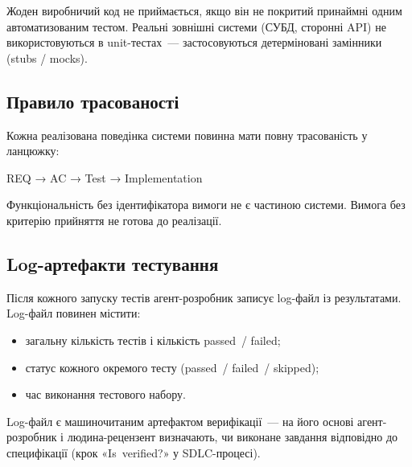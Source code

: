 Жоден виробничий код не приймається, якщо він не покритий принаймні одним автоматизованим тестом. Реальні зовнішні системи (СУБД, сторонні API) не використовуються в unit-тестах~--- застосовуються детерміновані замінники (stubs / mocks).

\subsection{Правило трасованості}

Кожна реалізована поведінка системи повинна мати повну трасованість у ланцюжку:

\begin{codelisting}
\caption{Ланцюжок трасованості}
\label{lst:trace}
\begin{skedcode}
REQ → AC → Test → Implementation
\end{skedcode}
\end{codelisting}

Функціональність без ідентифікатора вимоги не є частиною системи. Вимога без критерію прийняття не готова до реалізації.

\subsection{Log-артефакти тестування}

Після кожного запуску тестів агент-розробник записує log-файл із результатами.  Log-файл повинен містити:

\begin{itemize}
  \item загальну кількість тестів і кількість passed~/ failed;
  \item статус кожного окремого тесту (passed~/ failed~/ skipped);
  \item час виконання тестового набору.
\end{itemize}

Log-файл є машиночитаним артефактом верифікації~--- на його основі агент-розробник і людина-рецензент визначають, чи виконане завдання відповідно до специфікації (крок «Is~verified?» у SDLC-процесі).
